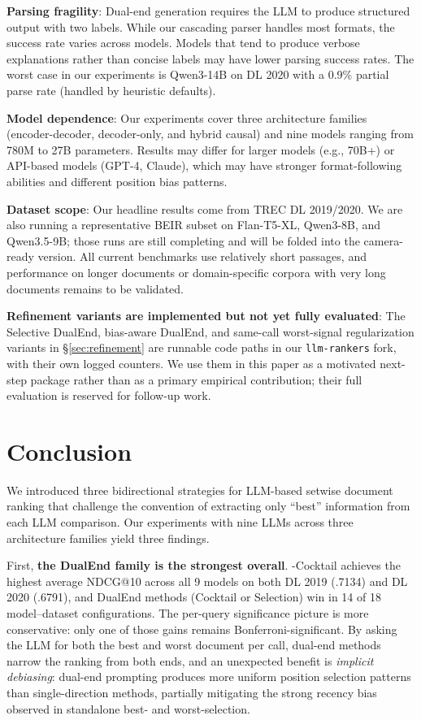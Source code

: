 \textbf{Parsing fragility}: Dual-end generation requires the LLM to produce structured output with two labels. While our cascading parser handles most formats, the success rate varies across models. Models that tend to produce verbose explanations rather than concise labels may have lower parsing success rates. The worst case in our experiments is Qwen3-14B on DL 2020 with a 0.9\% partial parse rate (handled by heuristic defaults).

\textbf{Model dependence}: Our experiments cover three architecture families (encoder-decoder, decoder-only, and hybrid causal) and nine models ranging from 780M to 27B parameters. Results may differ for larger models (e.g., 70B+) or API-based models (GPT-4, Claude), which may have stronger format-following abilities and different position bias patterns.

\textbf{Dataset scope}: Our headline results come from TREC DL 2019/2020. We are also running a representative BEIR subset on Flan-T5-XL, Qwen3-8B, and Qwen3.5-9B; those runs are still completing and will be folded into the camera-ready version. All current benchmarks use relatively short passages, and performance on longer documents or domain-specific corpora with very long documents remains to be validated.

\textbf{Refinement variants are implemented but not yet fully evaluated}: The Selective DualEnd, bias-aware DualEnd, and same-call worst-signal regularization variants in \S\ref{sec:refinement} are runnable code paths in our \texttt{llm-rankers} fork, with their own logged counters. We use them in this paper as a motivated next-step package rather than as a primary empirical contribution; their full evaluation is reserved for follow-up work.


\section{Conclusion}
\label{sec:conclusion}

We introduced three bidirectional strategies for LLM-based setwise document ranking that challenge the convention of extracting only ``best'' information from each LLM comparison. Our experiments with nine LLMs across three architecture families yield three findings.

First, \textbf{the DualEnd family is the strongest overall}. \dualend{}-Cocktail achieves the highest average NDCG@10 across all 9 models on both DL 2019 (.7134) and DL 2020 (.6791), and DualEnd methods (Cocktail or Selection) win in 14 of 18 model--dataset configurations. The per-query significance picture is more conservative: only one of those gains remains Bonferroni-significant. By asking the LLM for both the best and worst document per call, dual-end methods narrow the ranking from both ends, and an unexpected benefit is \emph{implicit debiasing}: dual-end prompting produces more uniform position selection patterns than single-direction methods, partially mitigating the strong recency bias observed in standalone best- and worst-selection.


